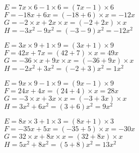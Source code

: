 \documentclass[a4paper,11pt,fleqn]{article}		%
\begin{document}
\begin{correction}
\begin{multicols}{2}

$E=  7x \times 6   -1 \times  6 =   (7  x  -1 ) \times 6 $\\
$F=  -18  x  +6  x=  (-18   +6 ) \times  x=  -12  x$\\
$G=  -2 \times  x  +2 x\times x=  (-2   +2 x) \times  x$\\
$H=  -3 x^2  -9 x^2=  (-3 -9) x^2=  -12 x^2$


$E=  3x \times 9   +1 \times  9 =   (3  x  +1 ) \times 9 $\\
$F=  42  x  +7  x=  (42   +7 ) \times  x=  49  x$\\
$G=  -36 \times  x  +9 x\times x=  (-36   +9 x) \times  x$\\
$H=  -2 x^2  +3 x^2=  (-2 +3) x^2=  1 x^2$


$E=  9x \times 9   -1 \times  9 =   (9  x  -1 ) \times 9 $\\
$F=  24  x  +4  x=  (24   +4 ) \times  x=  28  x$\\
$G=  -3 \times  x  +3 x\times x=  (-3   +3 x) \times  x$\\
$H=  3 x^2  +6 x^2=  (3 +6) x^2=  9 x^2$


$E=  8x \times 3   +1 \times  3 =   (8  x  +1 ) \times 3 $\\
$F=  -35  x  +5  x=  (-35   +5 ) \times  x=  -30  x$\\
$G=  32 \times  x  +8 x\times x=  (32   +8 x) \times  x$\\
$H=  5 x^2  +8 x^2=  (5 +8) x^2=  13 x^2$
\end{multicols}

\exon{}


\end{correction}
\end{document}
